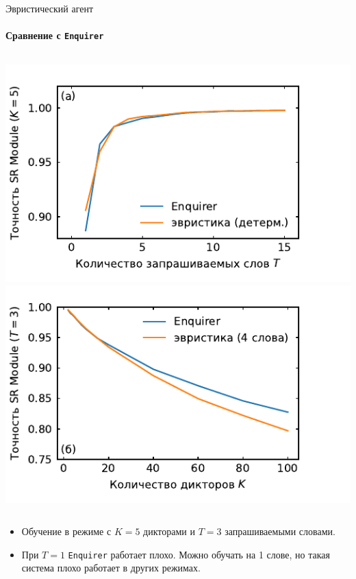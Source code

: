\documentclass[aspectratio=169]{beamer}
\newcommand{\enquirer}{\texttt{Enquirer}}
\newcommand{\imgscale}{0.8}
\begin{document}
\begin{frame}[t]{Эвристический агент}
    \framesubtitle{Сравнение с \enquirer}
    \begin{columns}
        \centering
        \includegraphics[scale=\imgscale]{../plots/word_sweep_heuristic.pdf}
        \includegraphics[scale=\imgscale]{../plots/guest_sweep_heuristic.pdf}
    \end{columns}\vspace*{1em}
    \begin{itemize}
        \item Обучение в режиме с $K = 5$ дикторами и $T = 3$ запрашиваемыми
              словами.
        \item При $T = 1$ \enquirer{} работает плохо.  Можно обучать на 1 слове,
              но такая система плохо работает в других режимах.
    \end{itemize}
\end{frame}
\end{document}

